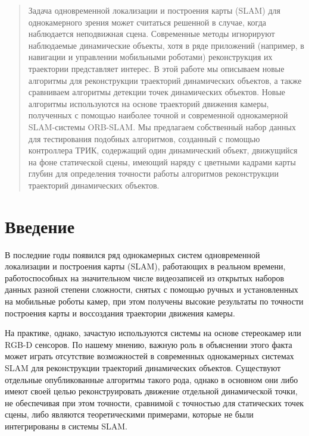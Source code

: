 \documentclass[conference]{IEEEtran}
\begin{document}
\begin{abstract}
Задача одновременной локализации и построения карты (SLAM) для однокамерного зрения может считаться решенной в случае, когда наблюдается неподвижная сцена. Современные методы игнорируют наблюдаемые динамические объекты, хотя в ряде приложений (например, в навигации и управлении мобильными роботами) реконструкция их траектории представляет интерес. В этой работе мы описываем новые алгоритмы для реконструкции траекторий динамических объектов, а также сравниваем алгоритмы детекции точек динамических объектов. Новые алгоритмы используются на основе траекторий движения камеры, полученных с помощью наиболее точной и современной однокамерной SLAM-системы ORB-SLAM. Мы предлагаем собственный набор данных для тестирования подобных алгоритмов, созданный с помощью контроллера ТРИК, содержащий один динамический объект, движущийся на фоне статической сцены, имеющий наряду с цветными кадрами карты глубин для определения точности работы алгоритмов реконструкции траекторий динамических объектов.
\end{abstract}





%
\IEEEpeerreviewmaketitle



\section{Введение}
В последние годы появился ряд однокамерных систем одновременной локализации и построения карты (SLAM), работающих в реальном времени, работоспособных  на значительном числе видеозаписей из открытых наборов данных разной степени сложности, снятых с помощью ручных и установленных на мобильные роботы камер, при этом получены высокие результаты по точности построения карты и воссоздания траектории движения камеры.

На практике, однако, зачастую используются системы на основе стереокамер или RGB-D сенсоров. По нашему мнению, важную роль в объяснении этого факта может играть отсутствие возможностей в современных однокамерных системах SLAM для реконструкции траекторий динамических объектов. Существуют отдельные опубликованные алгоритмы такого рода, однако в основном они либо имеют своей целью реконструировать движение отдельной динамической точки, не обеспечивая при этом точности, сравнимой с точностью для статических точек сцены, либо являются теоретическими примерами, которые не были интегрированы в системы SLAM.
\end{document}
